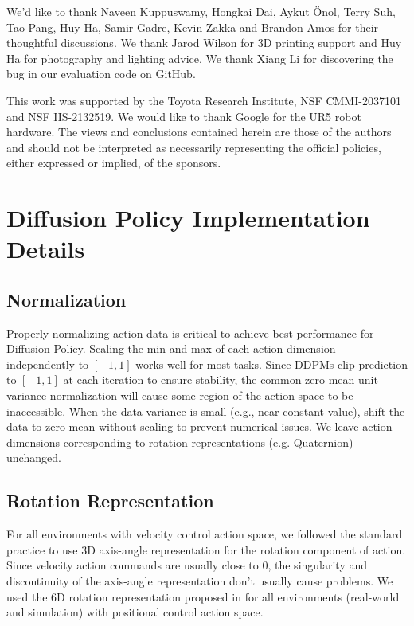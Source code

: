 \documentclass[Afour,sageh,times]{sagej}
\begin{document}
We'd like to thank Naveen Kuppuswamy, Hongkai Dai, Aykut Önol, Terry Suh, Tao Pang, Huy Ha, Samir Gadre, Kevin Zakka and Brandon Amos for their thoughtful discussions. We thank Jarod Wilson for 3D printing support and Huy Ha for photography and lighting advice. We thank Xiang Li for discovering the bug in our evaluation code on GitHub.



\begin{funding}
This work was supported by the Toyota Research Institute, NSF CMMI-2037101 and NSF IIS-2132519. We would like to thank Google for the UR5 robot hardware. The views and conclusions contained herein are those of the authors and should not be interpreted as necessarily representing the official policies, either expressed or implied, of the sponsors.
\end{funding}




\appendix
\section{Diffusion Policy Implementation Details}

\subsection{Normalization}
Properly normalizing action data is critical to achieve best performance for Diffusion Policy.
Scaling the min and max of each action dimension independently to $[-1,1]$ works well for most tasks.
Since DDPMs clip prediction to $[-1,1]$ at each iteration to ensure stability, the common zero-mean unit-variance normalization will cause some region of the action space to be inaccessible.
When the data variance is small (e.g., near constant value), shift the data to zero-mean without scaling to prevent numerical issues.
We leave action dimensions corresponding to rotation representations (e.g. Quaternion) unchanged.



\subsection{Rotation Representation}
For all environments with velocity control action space, we followed the standard practice \cite{robomimic} to use 3D axis-angle representation for the rotation component of action. Since velocity action commands are usually close to 0, the singularity and discontinuity of the axis-angle representation don't usually cause problems. We used the 6D rotation representation proposed in \citet{zhou2019continuity} for all environments (real-world and simulation) with positional control action space.
\end{document}
